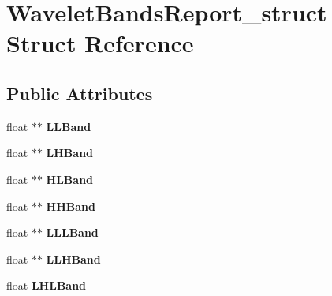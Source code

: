 \hypertarget{structWaveletBandsReport__struct}{
\section{WaveletBandsReport\_\-struct Struct Reference}
\label{structWaveletBandsReport__struct}
}
\subsection*{Public Attributes}
\begin{DoxyCompactItemize}
\item 
\hypertarget{structWaveletBandsReport__struct_a08216c02950d0deca7c35090c96b83d0}{
float $\ast$$\ast$ {\bfseries LLBand}}
\label{structWaveletBandsReport__struct_a08216c02950d0deca7c35090c96b83d0}

\item 
\hypertarget{structWaveletBandsReport__struct_a00cb422cebaaf5e1884d8c36fc6427e9}{
float $\ast$$\ast$ {\bfseries LHBand}}
\label{structWaveletBandsReport__struct_a00cb422cebaaf5e1884d8c36fc6427e9}

\item 
\hypertarget{structWaveletBandsReport__struct_a1a25fdeb587f6412a8db253facd8293d}{
float $\ast$$\ast$ {\bfseries HLBand}}
\label{structWaveletBandsReport__struct_a1a25fdeb587f6412a8db253facd8293d}

\item 
\hypertarget{structWaveletBandsReport__struct_a279a738bc5d49c6f1eed56466b669d74}{
float $\ast$$\ast$ {\bfseries HHBand}}
\label{structWaveletBandsReport__struct_a279a738bc5d49c6f1eed56466b669d74}

\item 
\hypertarget{structWaveletBandsReport__struct_aa4d08f84ab48aad8adc052d119ca5497}{
float $\ast$$\ast$ {\bfseries LLLBand}}
\label{structWaveletBandsReport__struct_aa4d08f84ab48aad8adc052d119ca5497}

\item 
\hypertarget{structWaveletBandsReport__struct_addfd4a72effa995dfa9c80333229298a}{
float $\ast$$\ast$ {\bfseries LLHBand}}
\label{structWaveletBandsReport__struct_addfd4a72effa995dfa9c80333229298a}

\item 
\hypertarget{structWaveletBandsReport__struct_a25bb6d27153b2f421f6381ecca61118c}{
float {\bfseries LHLBand}}
\label{structWaveletBandsReport__struct_a25bb6d27153b2f421f6381ecca61118c}


\end{DoxyCompactItemize}
